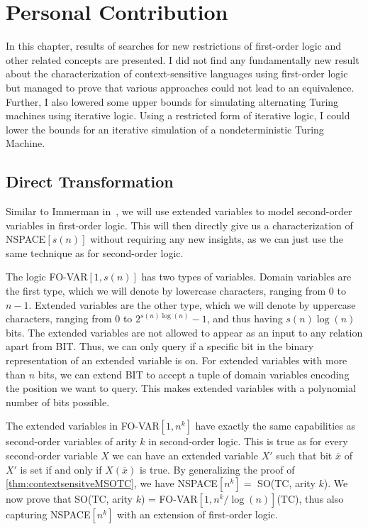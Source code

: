 \chapter{Personal Contribution}\label{ch:personal-contribution}

In this chapter, results of searches for new restrictions of first-order logic and other related concepts are presented.
I did not find any fundamentally new result about the characterization of context-sensitive languages using first-order logic but managed to prove that various approaches could not lead to an equivalence.
Further, I also lowered some upper bounds for simulating alternating Turing machines using iterative logic.
Using a restricted form of iterative logic, I could lower the bounds for an iterative simulation of a nondeterministic Turing Machine.


\section{Direct Transformation}\label{sec:direct-transformation}

Similar to Immerman in~\cite{descriptive-complexity}, we will use extended variables to model second-order variables in first-order logic.
This will then directly give us a characterization of NSPACE$[s(n)]$ without requiring any new insights, as we can just use the same technique as for second-order logic.

\begin{define}
    The logic FO-VAR$[1, s(n)]$ has two types of variables.
    Domain variables are the first type, which we will denote by lowercase characters, ranging from $0$ to $n - 1$.
    Extended variables are the other type, which we will denote by uppercase characters, ranging from $0$ to $2^{s(n)\log(n)} - 1$, and thus having $s(n)\log(n)$ bits.
    The extended variables are not allowed to appear as an input to any relation apart from BIT\@.
    Thus, we can only query if a specific bit in the binary representation of an extended variable is on.
    For extended variables with more than $n$ bits, we can extend BIT to accept a tuple of domain variables encoding the position we want to query.
    This makes extended variables with a polynomial number of bits possible.
\end{define}

The extended variables in FO-VAR$[1, n^k]$ have exactly the same capabilities as second-order variables of arity $k$ in second-order logic.
This is true as for every second-order variable $X$ we can have an extended variable $X'$ such that bit $\overline{x}$ of $X'$ is set if and only if $X(\overline{x})$ is true.
By generalizing the proof of \cref{thm:contextsensitveMSOTC}, we have NSPACE$[n^k] = $ SO(TC, arity $k$).
We now prove that SO(TC, arity $k$) = FO-VAR$[1, n^k/\log(n)]$(TC), thus also capturing NSPACE$[n^k]$ with an extension of first-order logic.

